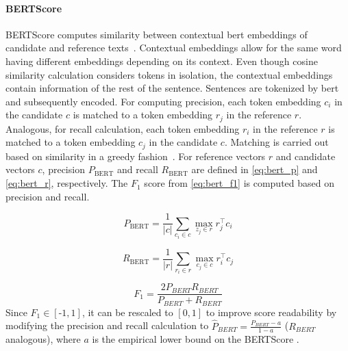 \paragraph{BERTScore}
BERTScore computes similarity between contextual \ac{bert} embeddings of candidate and reference texts~\citep{hanna_fine_grained_2021}. 
Contextual embeddings allow for the same word having different embeddings depending on its context.
Even though cosine similarity calculation considers tokens in isolation, the contextual embeddings contain information of the rest of the sentence.
Sentences are tokenized by \ac{bert} and subsequently encoded.
For computing precision, each token embedding $c_i$ in the candidate $c$ is matched to a token embedding $r_j$ in the reference $r$.
Analogous, for recall calculation, each token embedding $r_i$ in the reference $r$ is matched to a token embedding $c_j$ in the candidate $c$.
Matching is carried out based on similarity in a greedy fashion~\citep{zhang_bertscore_2020}.
For reference vectors $r$ and candidate vectors $c$, precision $P_{\text{BERT}}$ and recall $R_{\text{BERT}}$ are defined in \autoref{eq:bert_p} and \autoref{eq:bert_r}, respectively.
The $F_1$ score from \autoref{eq:bert_f1} is computed based on precision and recall.

\begin{equation}
    P_{\text{BERT}} = \frac{1}{|c|} \sum_{c_i \in c} \max_{z_j \in r} r_j^\top c_i
\label{eq:bert_p}
\end{equation}

\begin{equation}
    R_{\text{BERT}} = \frac{1}{|r|} \sum_{r_i \in r} \max_{c_j \in c} r_i^\top c_j
\label{eq:bert_r}
\end{equation}

\begin{equation}
    F_1 = \frac{2 P_{BERT} R_{BERT}}{P_{BERT} + R_{BERT}} 
\label{eq:bert_f1}
\end{equation}
Since $F_1 \in \left[\text{-}1,1\right]$, it can be rescaled to $[0,1]$ to improve score readability by modifying the precision and recall calculation 
to $\hat{P}_{BERT} = \frac{P_{BERT} - a}{1 - a}$ ($R_{BERT}$ analogous), where $a$ is the empirical lower bound on the BERTScore \citep{zhang_bertscore_2020,hanna_fine_grained_2021}.


